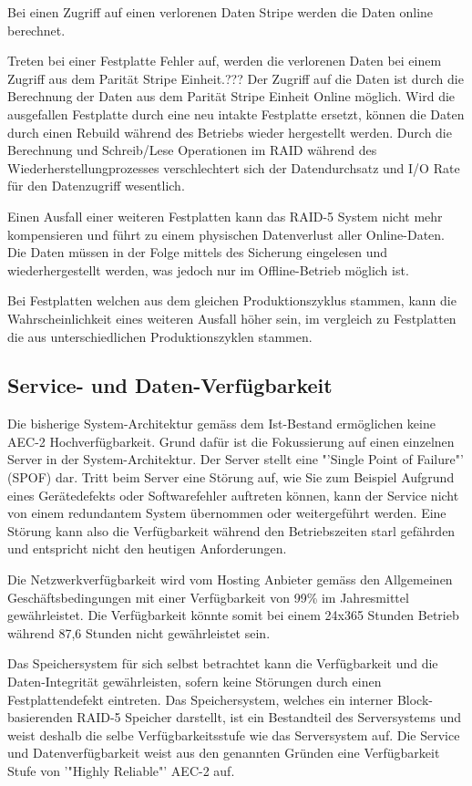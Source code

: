 Bei einen Zugriff auf einen verlorenen Daten Stripe werden die Daten online berechnet. 

Treten bei einer Festplatte Fehler auf, werden die verlorenen Daten bei einem Zugriff aus dem Parität Stripe Einheit.??? Der Zugriff auf die Daten ist durch die Berechnung der Daten aus dem Parität Stripe Einheit Online möglich. Wird die ausgefallen Festplatte durch eine neu intakte Festplatte ersetzt, können die Daten durch einen Rebuild während des Betriebs wieder hergestellt werden. Durch die Berechnung und Schreib/Lese Operationen im RAID während des Wiederherstellungprozesses verschlechtert sich der Datendurchsatz und I/O Rate für den Datenzugriff wesentlich.

Einen Ausfall einer weiteren Festplatten kann das RAID-5 System nicht mehr kompensieren und führt zu einem physischen Datenverlust aller Online-Daten. Die Daten müssen in der Folge mittels des Sicherung eingelesen und wiederhergestellt werden, was jedoch nur im Offline-Betrieb möglich ist. 

Bei Festplatten welchen aus dem gleichen Produktionszyklus stammen, kann die Wahrscheinlichkeit eines weiteren Ausfall höher sein, im vergleich zu Festplatten die aus unterschiedlichen Produktionszyklen stammen.

\subsection{Service- und Daten-Verfügbarkeit}
Die bisherige System-Architektur gemäss dem Ist-Bestand ermöglichen keine AEC-2 Hochverfügbarkeit. Grund dafür ist die Fokussierung auf einen einzelnen Server in der System-Architektur. Der Server stellt eine "'Single Point of Failure"' (SPOF) dar. Tritt beim Server eine Störung auf, wie Sie zum Beispiel Aufgrund eines Gerätedefekts oder Softwarefehler auftreten können, kann der Service nicht von einem redundantem System übernommen oder weitergeführt werden. Eine Störung kann also die Verfügbarkeit während den Betriebszeiten starl gefährden und entspricht nicht den heutigen Anforderungen.

Die Netzwerkverfügbarkeit wird vom Hosting Anbieter gemäss den Allgemeinen Geschäftsbedingungen \cite{Ag2009} mit einer Verfügbarkeit von 99\% im Jahresmittel gewährleistet. Die Verfügbarkeit könnte somit bei einem 24x365 Stunden Betrieb während 87,6 Stunden nicht gewährleistet sein.

Das Speichersystem für sich selbst betrachtet kann die Verfügbarkeit und die Daten-Integrität gewährleisten, sofern keine Störungen durch einen Festplattendefekt eintreten. Das Speichersystem, welches ein interner Block-basierenden RAID-5 Speicher darstellt, ist ein Bestandteil des Serversystems und weist deshalb die selbe Verfügbarkeitsstufe wie das Serversystem auf. Die Service und Datenverfügbarkeit weist aus den genannten Gründen eine Verfügbarkeit Stufe von '"Highly Reliable"' AEC-2 auf.

